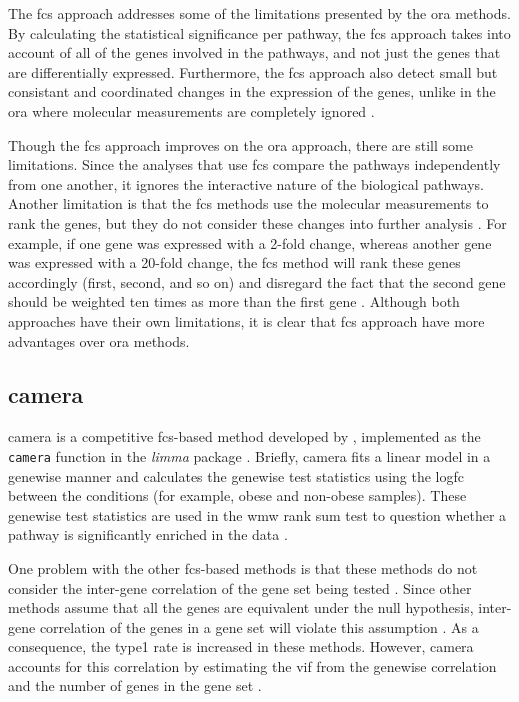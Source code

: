 The \Gls{fcs} approach addresses some of the limitations presented by the \gls{ora} methods.
By calculating the statistical significance per pathway, the \gls{fcs} approach takes into account of all of the genes involved in the pathways, and not just the genes that are differentially expressed.
Furthermore, the \gls{fcs} approach also detect small but consistant and coordinated changes in the expression of the genes, unlike in the \gls{ora} where molecular measurements are completely ignored \citep{Khatri2012}.

Though the \gls{fcs} approach improves on the \gls{ora} approach, there are still some limitations.
Since the analyses that use \gls{fcs} compare the pathways independently from one another, it ignores the interactive nature of the biological pathways.
Another limitation is that the \gls{fcs} methods use the molecular measurements to rank the genes, but they do not consider these changes into further analysis \citep{Khatri2012}.
For example, if one gene was expressed with a 2-fold change, whereas another gene was expressed with a 20-fold change, the \gls{fcs} method will rank these genes accordingly (first, second, and so on) and disregard the fact that the second gene should be weighted ten times as more than the first gene \citep{Khatri2012}.
Although both approaches have their own limitations, it is clear that \gls{fcs} approach have more advantages over \gls{ora} methods.

\subsection{\Gls{camera}}
\label{sub:camera}

\Acrfull{camera} is a competitive \gls{fcs}-based method developed by \citet{Wu2012}, implemented as the \texttt{camera} function in the \textit{limma} package \citep{Ritchie2015}.
Briefly, \gls{camera} fits a linear model in a genewise manner and calculates the genewise test statistics using the log\gls{fc} between the conditions (for example, obese and non-obese samples).
These genewise test statistics are used in the \gls{wmw} rank sum test to question whether a pathway is significantly enriched in the data \citep{Wu2012}.

One problem with the other \gls{fcs}-based methods is that these methods do not consider the inter-gene correlation of the gene set being tested \citep{Wu2012}.
Since other methods assume that all the genes are equivalent under the null hypothesis, inter-gene correlation of the genes in a gene set will violate this assumption \citep{Wu2012}.
As a consequence, the \gls{type1} rate is increased in these methods.
However, \Gls{camera} accounts for this correlation by estimating the \gls{vif} from the genewise correlation and the number of genes in the gene set \citep{Wu2012}.

